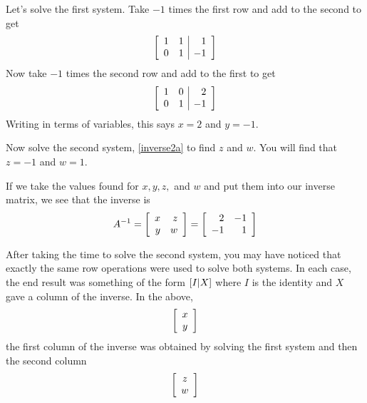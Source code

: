 Let's solve the first system. Take $-1$ times
the first row and add to the second to get
\begin{equation*}
\left[
\begin{array}{rr|r}
1 & 1 & 1 \\
0 & 1 & -1
\end{array}
\right]
\end{equation*}
Now take $-1$ times the second row and add to the first to
get
\begin{equation*}
\left[
\begin{array}{rr|r}
1 & 0 & 2 \\
0 & 1 & -1
\end{array}
\right] 
\end{equation*}
Writing in terms of variables, this says $x=2$ and $y=-1.$

Now solve the second system, \ref{inverse2a} to find $z$ and $w.$ You will find that 
$z = -1$ and $w = 1$.

If we take the values found for $x,y,z,$ and $w$
 and put them into our inverse matrix, we see that the inverse
is
\begin{equation*}
A^{-1} = 
\left[
\begin{array}{rr}
x & z \\
y & w
\end{array}
\right]
=
\left[
\begin{array}{rr}
2 & -1 \\
-1 & 1
\end{array}
\right] 
\end{equation*}

After taking the time to solve the second system, you may have noticed that exactly the same row
operations were used to solve both systems. In each case, the end result was
something of the form $\left[ I|X\right] $ where $I$ is the
identity and $X$ gave a column of the inverse. In the above, 
\begin{equation*}
\left[
\begin{array}{c}
x \\
y
\end{array}
\right]
\end{equation*}
 the first column of the inverse was obtained by solving the first system and then the
second column 
\begin{equation*}
\left[
\begin{array}{c}
z \\
w
\end{array}
\right] 
\end{equation*}

